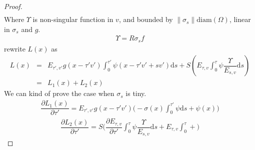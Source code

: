 \documentclass[12pt,a4paper]{article}
\begin{document}
\begin{proof}
\begin{eqnarray}
\end{eqnarray} 
Where $\Upsilon$ is non-singular function in $v$, and bounded by $\|\sigma_s\|\mathrm{diam}(\Omega)$, linear in $\sigma_s$ and $g$.
\begin{eqnarray}
\Upsilon = R\sigma_s f
\end{eqnarray}
rewrite $L(x)$ as
\begin{eqnarray}
L(x) &=& E_{\tau',v'}g(x-\tau'v')\int_0^{\tau'}\psi(x-\tau' v' + sv')\mathrm{d}s + S\left(E_{\tau,v} \int_0^{\tau}\psi\dfrac{\Upsilon}{E_{s,v}}\mathrm{d}s\right) \nonumber\\
 &=& L_1(x) + L_2(x)
\end{eqnarray}
We can kind of prove the case when $\sigma_s$ is tiny.
\begin{eqnarray}
\dfrac{\partial L_1(x)}{\partial \tau'} =E_{\tau',v'}g(x-\tau'v')\Big( -\sigma(x) \int_0^{\tau'}\psi\mathrm{d}s + \psi(x)\Big)
\end{eqnarray}
\begin{eqnarray}
\dfrac{\partial L_2(x)}{\partial \tau'} = S\Big(\dfrac{\partial E_{\tau,v}}{\partial \tau'}\int_0^{\tau}\psi\dfrac{\Upsilon}{E_{s,v}}\mathrm{d}s + E_{\tau,v}\int_0^{\tau} + \Big)
\end{eqnarray}
\end{proof}
\end{document}

